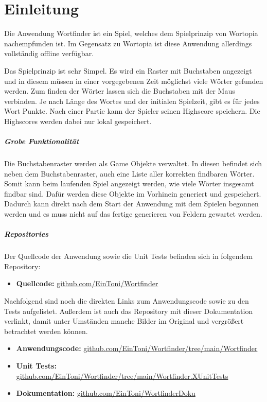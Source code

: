 \chapter{Einleitung}

Die Anwendung \glqq Wortfinder\grqq{} ist ein Spiel, welches dem Spielprinzip von Wortopia nachempfunden ist. Im Gegensatz zu Wortopia ist diese Anwendung allerdings vollständig offline verfügbar.

Das Spielprinzip ist sehr Simpel. Es wird ein Raster mit Buchstaben angezeigt und in diesem müssen in einer vorgegebenen Zeit möglichst viele Wörter gefunden werden. Zum finden der Wörter lassen sich die Buchstaben mit der Maus verbinden. Je nach Länge des Wortes und der initialen Spielzeit, gibt es für jedes Wort Punkte. Nach einer Partie kann der Spieler seinen Highscore speichern. Die Highscores werden dabei nur lokal gespeichert.


\paragraph{Grobe Funktionalität}
Die Buchstabenraster werden als \glqq Game\grqq{} Objekte verwaltet. In diesen befindet sich neben dem Buchstabenraster, auch eine Liste aller korrekten findbaren Wörter. Somit kann beim laufenden Spiel angezeigt werden, wie viele Wörter insgesamt findbar sind. Dafür werden diese Objekte im Vorhinein generiert und gespeichert. Dadurch kann direkt nach dem Start der Anwendung mit dem Spielen begonnen werden und es muss nicht auf das fertige generieren von Feldern gewartet werden.

\paragraph{Repositories}
Der Quellcode der Anwendung sowie die Unit Tests befinden sich in folgendem Repository:
\begin{itemize}
\item \textbf{Quellcode:} \href{https://github.com/EinToni/Wortfinder}{github.com/EinToni/Wortfinder}
\end{itemize}

Nachfolgend sind noch die direkten Links zum Anwendungscode sowie zu den Tests aufgelistet. Außerdem ist auch das Repository mit dieser Dokumentation verlinkt, damit unter Umständen manche Bilder im Original und vergrößert betrachtet werden können.

\begin{itemize}
\item \textbf{Anwendungscode:} \href{https://github.com/EinToni/Wortfinder/tree/main/Wortfinder}{github.com/EinToni/Wortfinder/tree/main/Wortfinder}
\item \textbf{Unit Tests:} \href{https://github.com/EinToni/Wortfinder/tree/main/Wortfinder.XUnitTests}{github.com/EinToni/Wortfinder/tree/main/Wortfinder.XUnitTests}
\item \textbf{Dokumentation:} \href{https://github.com/EinToni/WortfinderDoku}{github.com/EinToni/WortfinderDoku}
\end{itemize}
